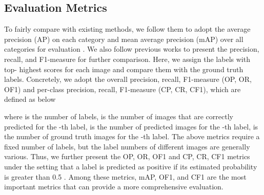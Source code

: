 \documentclass[10pt,twocolumn,letterpaper]{article}
\begin{document}
\subsection{Evaluation Metrics}
To fairly compare with existing methods, we follow them to adopt the average precision (AP) on each category and mean average precision (mAP) over all categories for evaluation \cite{wei2016hcp,yang2016exploit}. We also follow previous works \cite{zhu2017learning,li2017improving} to present the precision, recall, and F1-measure for further comparison. Here, we assign the labels with top- highest scores for each image and compare them with the ground truth labels. Concretely, we adopt the overall precision, recall, F1-measure (OP, OR, OF1) and per-class precision, recall, F1-measure (CP, CR, CF1), which are defined as below
\begin{small}

\end{small}where  is the number of labels,  is the number of images that are correctly predicted for the -th label,  is the number of predicted images for the -th label,  is the number of ground truth images for the -th label. The above metrics require a fixed number of labels, but the label numbers of different images are generally various. Thus, we further present the OP, OR, OF1 and CP, CR, CF1 metrics under the setting that a label is predicted as positive if its estimated probability is greater than 0.5 \cite{zhu2017learning}. Among these metrics, mAP, OF1, and CF1 are the most important metrics that can provide a more comprehensive evaluation.
\end{document}
